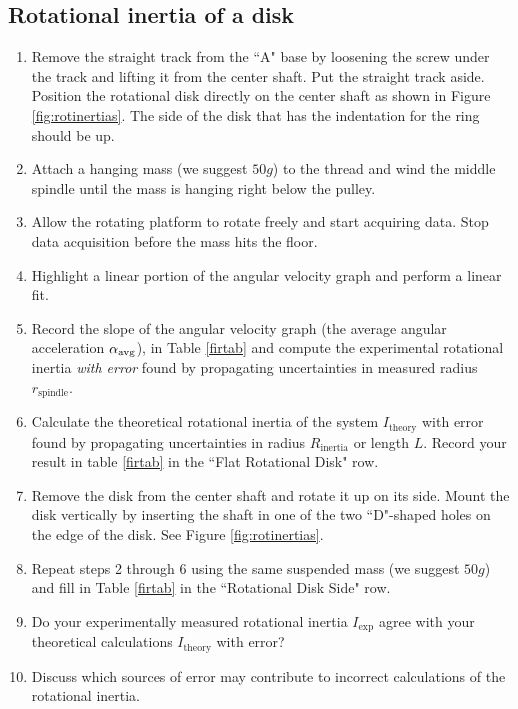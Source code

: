\subsection{Rotational inertia of a disk}

\label{diskinert}
\begin{enumerate}
	\item Remove the straight track from the ``A" base by loosening the screw under the track and lifting it from the center shaft.  Put the straight track aside.  Position the rotational disk directly on the center shaft as shown in Figure \ref{fig:rotinertias}.  The side of the disk that has the indentation for the ring should be up.
	\item Attach a hanging mass (we suggest $50g$) to the thread and wind the middle spindle until the mass is hanging right below the pulley.
	\item Allow the rotating platform to rotate freely and start acquiring data.  Stop data acquisition before the mass hits the floor.
	\item Highlight a linear portion of the angular velocity graph and perform a linear fit.
	\item Record the slope of the angular velocity graph (the average angular acceleration $\alpha _{\rm avg}$), in Table \ref{firtab} and compute the experimental rotational inertia {\it{with error}} found by propagating uncertainties in measured radius $r_\text{spindle}$.
\item Calculate the theoretical rotational inertia of the system $I_\text{theory}$ with error found by propagating uncertainties in radius $R_\text{inertia}$ or length $L$. Record your result in table \ref{firtab} in the ``Flat Rotational Disk" row.
	\item Remove the disk from the center shaft and rotate it up on its side.  Mount the disk vertically by inserting the shaft in one of the two ``D"-shaped holes on the edge of the disk.  See Figure \ref{fig:rotinertias}.
\item Repeat steps 2 through 6 using the same suspended mass (we suggest $50g$) and fill in Table \ref{firtab} in the ``Rotational Disk Side" row.
\item Do your experimentally measured rotational inertia $I_\text{exp}$ agree with your theoretical calculations $I_\text{theory}$ with error?
\item Discuss which sources of error may contribute to incorrect calculations of the rotational inertia.
\end{enumerate}

